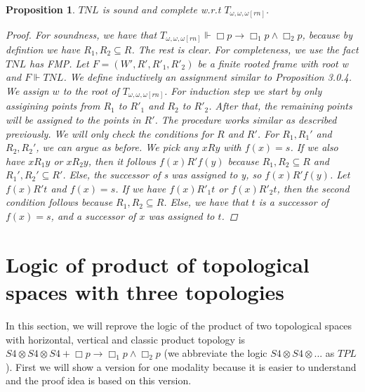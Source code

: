 \documentclass[12pt, a4paper]{scrartcl}
\newtheorem{proposition}[definition]{Proposition}
\begin{document}
\begin{proposition}
    $\mathit{TNL}$ is sound and complete w.r.t $T_{\omega,\omega,\omega[rn]}$.

    \begin{proof}
    For soundness, we have that $T_{\omega,\omega,\omega[rn]} \Vdash \Box p \rightarrow \Box_1 p \land \Box_2p$, because by defintion we have $R_1,R_2 \subseteq R$. The rest is clear.
    For completeness, we use the fact $\mathit{TNL}$ has FMP. Let $F = (W',R', R'_1, R'_2)$ be a finite rooted frame with root w and $F \Vdash TNL$. We define inductively an
    assignment similar to Proposition 3.0.4. We assign $w$ to the root of $T_{\omega,\omega,\omega[rn]}$. For induction step we start by only assigining points from $R_1$ to $R'_1$ and $R_2$ to $R'_2$. After that, the remaining points will be assigned to the points in $R'$.
    The procedure works similar as described previously. \newline
    We will only check the conditions for $R$ and $R'$. For $R_1, R_1'$ and $R_2, R_2'$, we can argue as before. We pick any $xRy$ with $f(x) = s$. 
    If we also have $xR_1y$ or $xR_2y$, then it follows $f(x)R' f(y)$ because $R_1, R_2 \subseteq R$ and $R_1', R_2' \subseteq R'$. Else, the successor of s was assigned to y, so $f(x)R'f(y)$. \newline
    Let $f(x)R't$ and $f(x) = s$. If we have $f(x) R'_1 t$ or $f(x) R'_2 t$, then the second condition follows because $R_1,R_2 \subseteq R$.
    Else, we have that $t$ is a successor of $f(x) = s$, and a successor of $x$ was assigned to $t$.
    \end{proof}
        
\end{proposition}




\clearpage

\section{Logic of product of topological spaces with three topologies}
In this section, we will reprove the logic of the product of two topological spaces with horizontal, vertical and classic product topology is 
$S4 \otimes S4 \otimes S4 + \Box p \rightarrow \Box_1 p \land \Box_2 p$ (we abbreviate the logic $S4 \otimes S4 \otimes ...$ as $\mathit{TPL}$). First we will show a version for one modality
because it is easier to understand and the proof idea is based on this version.
\end{document}

